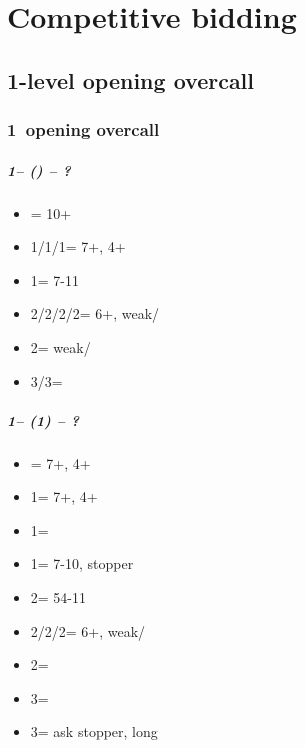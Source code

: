 \documentclass[12pt, a4paper]{report}
\begin{document}
\part*{\colorbox{RoyalPurple!30}{Competitive bidding}}

\chapter*{\colorbox{Plum!30}{1-level opening overcall}}

\section*{\colorbox{blue!30}{1\clubs\ opening overcall}}

\subsubsection*{1\clubs -- (\dbl) -- ?}
\begin{itemize}
    \item \rdbl = 10+
    \item 1\diams/1\hearts/1\spades = 7+\hcp, 4+
    \item 1\nt = 7-11
    \item 2\clubs/2\diams/2\hearts/2\spades = \trsf{\diams/\hearts/\spades/\clubs} 6+, weak/\gf
    \item 2\nt = \minor weak/\gf
    \item 3\clubs/3\diams = \inv
\end{itemize}

\subsubsection*{1\clubs -- (1\diams) -- ?}
\begin{itemize}
    \item \dbl = 7+, 4+\hearts
    \item 1\hearts = 7+, 4+\spades
    \item 1\spades = \nt
    \item 1\nt = 7-10, \diams stopper
    \item 2\clubs = 54-11
    \item 2\diams/2\hearts/2\spades = \trsf{\hearts/\spades/\clubs} 6+, weak/\gf
    \item 2\nt = \inv
    \item 3\clubs = \inv
    \item 3\diams = ask stopper, long \clubs
\end{itemize}
\end{document}
